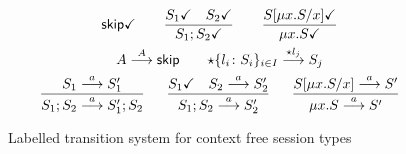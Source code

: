 \begin{figure}[tp]
  \begin{gather*}
    \DONE{\skipk}
    \qquad
    \frac{\DONE{S_1} \quad \DONE{S_2}}{\DONE{S_1; S_2}}
    \qquad
    \frac{\DONE{S[\mu x.S/x]}}{\DONE{\mu x.S}}
    \\
    {A \LTSderives[A] \skipk }
    \qquad
    {\star\{l_i\colon S_i\}_{i\in I} \LTSderives[\star l_j] S_j}
    \\
    \frac{S_1 \LTSderives S_1'}{S_1; S_2 \LTSderives S_1';S_2}
    \quad\;\;
    \frac{\DONE{S_1} \quad S_2 \LTSderives S_2'}{S_1; S_2 \LTSderives S_2'}
    \quad\;\;
    \frac{S[\mu x.S/x] \LTSderives S'}{\mu x.S \LTSderives S'}
  \end{gather*}
  \caption{Labelled transition system for context free session types}
  \label{fig:lts}
\end{figure}

